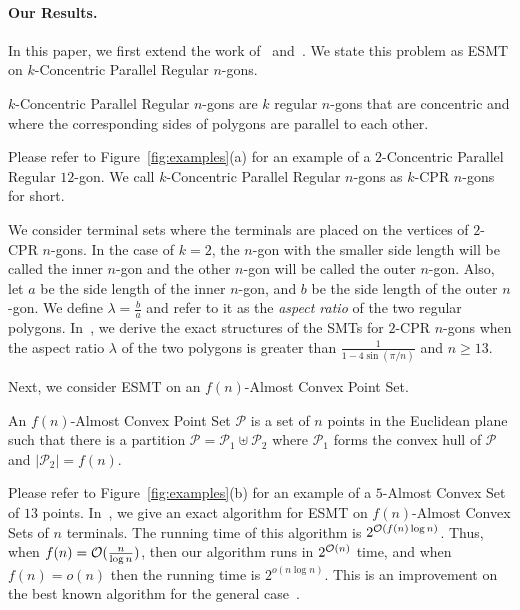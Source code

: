 \paragraph*{Our Results.}

 In this paper, we first extend the work of~\cite{du1987steiner}  and~\cite{weng1995steiner}.
We state this problem as ESMT on $k$-Concentric Parallel Regular $n$-gons.

 \begin{definition} \label{def:regular conc parallel polygons toh}
     $k$-Concentric Parallel Regular $n$-gons are $k$ regular $n$-gons that are concentric and where the corresponding sides of polygons are parallel to each other. 
 \end{definition}

 Please refer to Figure~\ref{fig:examples}(a) for an example of a $2$-Concentric Parallel Regular $12$-gon. We call $k$-Concentric Parallel Regular $n$-gons as $k$-CPR $n$-gons for short.

 
 We consider terminal sets where the terminals are placed on the vertices of $2$-CPR $n$-gons. In the case of $k=2$, the $n$-gon with the smaller side length will be called the inner $n$-gon and the other $n$-gon will be called the outer $n$-gon. Also, let $a$ be the side length of the inner $n$-gon, and $b$ be the side length of the outer $n$-gon. We define $\lambda = \frac{b}{a}$ and refer to it as the \emph{aspect ratio} of the two regular polygons. In~, we derive the exact structures of the SMTs for $2$-CPR $n$-gons when the aspect ratio $\lambda$ of the two polygons is greater than $\frac{1}{1-4\sin{(\pi/n)}}$ and $n \geq 13$.

 Next, we consider ESMT on an $f(n)$-Almost Convex Point Set.
 \begin{definition} \label{def:almost_conv}
     An $f(n)$-Almost Convex Point Set $\mathcal P$ is a set of $n$ points in the Euclidean plane such that there is a partition $\mathcal P = \mathcal P_1 \uplus \mathcal P_2$ where $\mathcal P_1$ forms the convex hull of $\mathcal P$ and $|\mathcal P_2| = f(n)$.
 \end{definition}
Please refer to Figure~\ref{fig:examples}(b) for an example of a $5$-Almost Convex Set of $13$ points. In~, we give an exact algorithm for ESMT on $f(n)$-Almost Convex Sets of $n$ terminals. The running time of this algorithm is $2^{\mathcal{O}(f(n) \log n)}$. Thus, when $f(n) = \mathcal{O}(\frac{n}{\log n})$, then our algorithm runs in $2^{\mathcal{O}(n)}$ time, and when $f(n) = o(n)$ then the running time is $2^{o(n\log n)}$. This is an  improvement on the best known algorithm for the general case~\cite{hwang1992steiner}.

